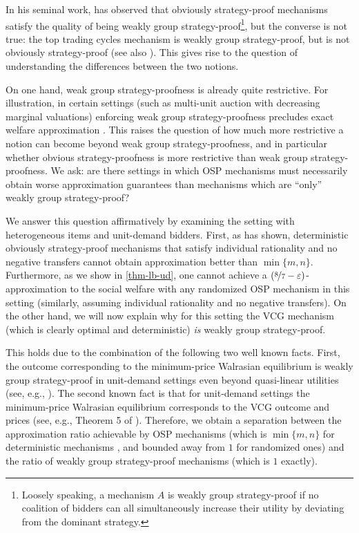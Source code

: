 In his seminal work, \cite{li} has observed that  obviously strategy-proof mechanisms satisfy the quality of being weakly group strategy-proof\footnote{Loosely speaking, a mechanism $A$ is weakly group strategy-proof if no coalition of bidders can all simultaneously increase their utility by deviating from the dominant strategy.}, but the converse is not true: the top trading cycles mechanism is weakly group strategy-proof, but is not obviously strategy-proof (see also \cite{troyan2019obviously}). This gives rise to the question of understanding the differences between the two notions.

On one hand, weak group strategy-proofness is already
quite restrictive. For illustration, in certain settings (such as multi-unit auction with decreasing marginal valuations)  enforcing weak group strategy-proofness precludes exact welfare approximation \cite{GMR17}. 
This raises the question of how much more restrictive a notion can become beyond weak group strategy-proofness, and in particular whether obvious strategy-proofness is more restrictive than weak group strategy-proofness.  We ask:
are there settings in which OSP mechanisms must necessarily obtain worse approximation guarantees than mechanisms which are ``only'' weakly group strategy-proof? 

We answer this question affirmatively by examining the setting with heterogeneous items and unit-demand bidders.  First, as \cite{Ron24} has shown, deterministic obviously strategy-proof mechanisms that satisfy individual rationality and no negative transfers cannot obtain approximation better than $\min\{m,n\}$. Furthermore, as we show in \cref{thm-lb-ud},  one cannot achieve a $(\nicefrac 8 7-\varepsilon)$-approximation to the social welfare with any randomized OSP mechanism in this setting (similarly, assuming individual rationality and no negative transfers).  On the other hand, we will now explain why  for this setting the VCG mechanism (which is clearly optimal and deterministic) \emph{is} weakly group strategy-proof.  

This holds due to the combination of the following two well known facts.
First, the outcome corresponding to the minimum-price Walrasian equilibrium is weakly group strategy-proof in unit-demand settings even beyond quasi-linear utilities (see, e.g., \cite{morimoto2015strategy}). The second known fact is that for unit-demand settings the minimum-price Walrasian equilibrium corresponds to the VCG outcome and prices (see, e.g., Theorem 5 of \cite{gul1999walrasian}).
Therefore, we obtain a separation between the approximation ratio achievable by OSP mechanisms (which is $\min\{m,n\}$ for deterministic mechanisms \cite{Ron24}, and bounded away from $1$ for randomized ones) and the ratio of weakly group strategy-proof mechanisms (which is $1$ exactly).  


